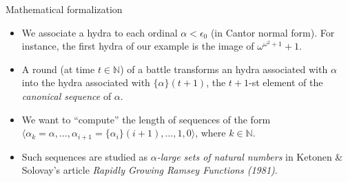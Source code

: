 \documentclass[10pt]{beamer}
\newcommand{\canonseq}[2]{\mbox{$\{#1\}(#2)$}}
\begin{document}

\begin{frame}
    \begin{block}{Mathematical formalization}
    
    \begin{itemize}
    \item   We associate a hydra to each ordinal \textcolor{mathcolor}{$\alpha<\epsilon_0$} (in Cantor normal form). For instance, the first hydra of our example is the image of \textcolor{mathcolor}{$\omega^{\omega^2+1}+1$}.
    \item A round (at time $t\in\mathbb{N}$) of a battle transforms an hydra associated with \textcolor{mathcolor}{$\alpha$} into the hydra associated with \textcolor{mathcolor}{$\canonseq{\alpha}{t+1}$}, the $t+1$-st element of the \emph{canonical sequence} of \textcolor{mathcolor}{$\alpha$}.
    \item We want to ``compute'' the length of sequences of the form 
      \textcolor{mathcolor}{$\langle \alpha_k=\alpha,\dots,\alpha_{i+1}=\canonseq{\alpha_i}{i+1},\dots, 1,0\rangle$}, where \textcolor{mathcolor}{$k\in\mathbb{N}$}.
      \item Such sequences are studied
      as \emph{$\alpha$-large sets of natural numbers}  in Ketonen \& Solovay's article
      \emph{Rapidly Growing {R}amsey Functions (1981)}.
    \end{itemize}
  \end{block}
\end{frame}

\end{document}
